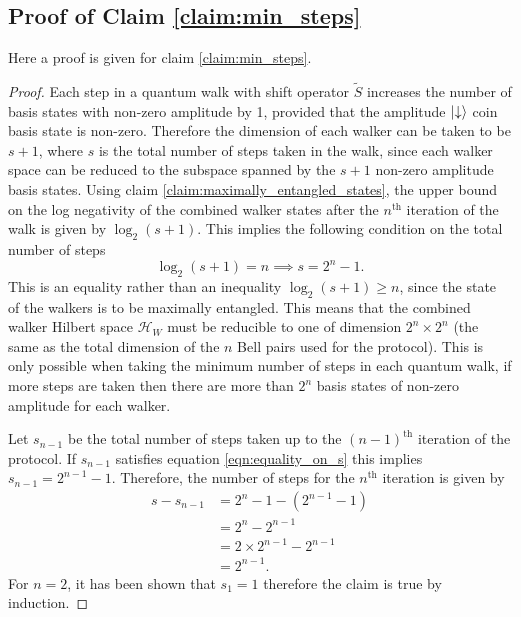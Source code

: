 \begin{appendices}
\newpage
\section{Proof of Claim \ref{claim:min_steps}}
\label{appendix:min_steps}
\setcounter{equation}{0}
\renewcommand{\theequation}{B.\arabic{equation}}
Here a proof is given for claim \ref{claim:min_steps}.

\begin{proof}
    Each step in a quantum walk with shift operator $\tilde{S}$ increases the number of basis states with non-zero amplitude by 1, provided that the amplitude $\ket{\downarrow}$ coin basis state is non-zero.
    Therefore the dimension of each walker can be taken to be $s + 1$, where $s$ is the total number of steps taken in the walk, since each walker space can be reduced to the subspace spanned by the $s+1$ non-zero amplitude basis states.
    Using claim \ref{claim:maximally_entangled_states}, the upper bound on the log negativity of the combined walker states after the $n^{\text{th}}$ iteration of the walk is given by $\log_2(s+1)$.
    This implies the following condition on the total number of steps
    \begin{equation}
        \log_2(s+1) = n \implies s = 2^n -1.
        \label{eqn:equality_on_s}
    \end{equation}
    This is an equality rather than an inequality $\log_2(s+1) \geq n$, since the state of the walkers is to be maximally entangled.
    This means that the combined walker Hilbert space $\mathcal{H}_W$ must be reducible to one of dimension $2^n \times 2^n$ (the same as the total dimension of the $n$ Bell pairs used for the protocol).
    This is only possible when taking the minimum number of steps in each quantum walk, if more steps are taken then there are more than $2^n$ basis states of non-zero amplitude for each walker.
    
    Let $s_{n-1}$ be the total number of steps taken up to the $(n-1)^\text{th}$ iteration of the protocol.
    If $s_{n-1}$ satisfies equation \ref{eqn:equality_on_s} this implies $s_{n-1} = 2^{n-1} -1$.
    Therefore, the number of steps for the $n^{\text{th}}$ iteration is given by
    \begin{align}
        s - s_{n-1} &= 2^{n} - 1 - (2^{n-1} -1)\\
        &= 2^n - 2^{n-1}\\
        &= 2 \times 2^{n-1} - 2^{n-1}\\
        &= 2^{n-1}.
    \end{align}
    For $n = 2$, it has been shown that $s_1 = 1$ therefore the claim is true by induction.
\end{proof}


\end{appendices}
